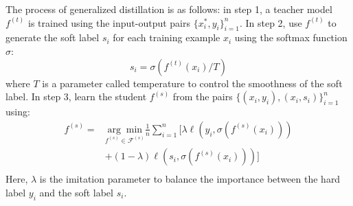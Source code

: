 The process of generalized distillation is as follows: in step 1, a teacher model ${f}^{(t)}$ is trained using the input-output pairs $\{x^*_i,y_i\}_{i=1}^n$. In step 2, use ${f}^{(t)}$ to generate the soft label $s_i$ for each training example $x_i$ using the softmax function $\sigma$:
\begin{equation}\label{eq:softmax_T}
s_i=\sigma(f^{(t)}(x_i)/T)
\end{equation}
where $T$ is a parameter called temperature to control the smoothness of the soft label. In step 3, learn the student ${f}^{(s)}$ from the pairs $\{\left(x_i,y_i\right),\left(x_i,s_i\right)\}_{i=1}^n$ using:
\begin{equation}\label{eq:distill}
\begin{aligned}
f^{(s)}=&\underset{f^{(s)} \in \mathcal{F}^{(s)}}{\arg \min}\frac{1}{n}\sum_{i=1}^{n}\bigg[\lambda\ell\left(y_i,\sigma(f^{(s)}(x_i))\right)\\
&+(1-\lambda)\ell\left(s_i,\sigma(f^{(s)}(x_i))\right)\bigg]\\
\end{aligned}
\end{equation}
Here, $\lambda$ is the imitation parameter to balance the importance between the hard label $y_i$ and the soft label $s_i$.

